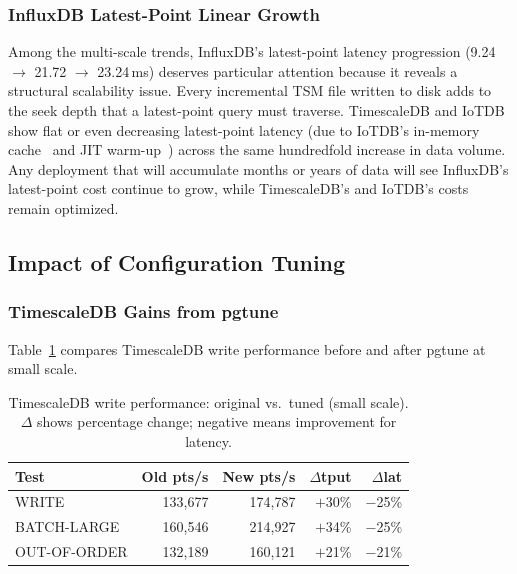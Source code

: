 \subsubsection{InfluxDB Latest-Point Linear Growth}

Among the multi-scale trends, InfluxDB's latest-point latency progression (9.24 $\to$
21.72 $\to$ 23.24\,ms) deserves particular attention because it reveals a structural
scalability issue. Every incremental TSM file written to disk adds to the seek depth
that a latest-point query must traverse. TimescaleDB and IoTDB show flat or even
decreasing latest-point latency (due to IoTDB's in-memory cache~\citep{iotdblastquery} and JIT warm-up~\citep{barrett2017warmup})
across the same hundredfold increase in data volume. Any deployment that will accumulate months or years of
data will see InfluxDB's latest-point cost continue to grow, while TimescaleDB's
and IoTDB's costs remain optimized.

\subsection{Impact of Configuration Tuning}
\label{sec:tuning-results}

\subsubsection{TimescaleDB Gains from pgtune}

Table~\ref{tab:tsdb-tuning} compares TimescaleDB write performance before and after
pgtune at small scale.

\begin{table}[t]
  \centering
  \caption{TimescaleDB write performance: original vs.\ tuned (small scale).
  $\Delta$ shows percentage change; negative means improvement for latency.}
  \label{tab:tsdb-tuning}
  \begin{tabular}{lrrrr}
    \hline
    \textbf{Test} & \textbf{Old pts/s} & \textbf{New pts/s} & $\Delta$tput & $\Delta$lat \\
    \hline
    WRITE        & 133{,}677 & 174{,}787 & $+$30\% & $-$25\% \\
    BATCH-LARGE  & 160{,}546 & 214{,}927 & $+$34\% & $-$25\% \\
    OUT-OF-ORDER & 132{,}189 & 160{,}121 & $+$21\% & $-$21\% \\
    \hline
  \end{tabular}
\end{table}

